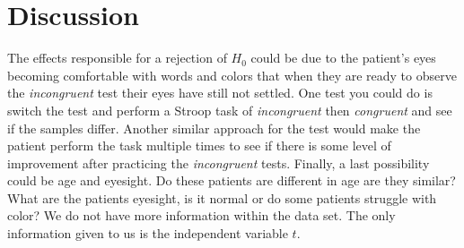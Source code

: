 \documentclass[8pt]{article}
\newcommand{\8}{\bar}
\begin{document}
\section{Discussion}
The effects responsible for a rejection of $H_{0}$ could be due to the patient's eyes becoming comfortable with words and colors that when they are ready to observe the \textit{incongruent} test their eyes have still not settled. One test you could do is switch the test and perform a Stroop task of \textit{incongruent} then \textit{congruent} and see if the samples differ. Another similar approach for the test would make the patient perform the task multiple times to see if there is some level of improvement after practicing the \textit{incongruent} tests. Finally, a last possibility could be age and eyesight. Do these patients are different in age are they similar? What are the patients eyesight, is it normal or do some patients struggle with color? We do not have more information within the data set. The only information given to us is the independent variable $t$. 
\end{document}

